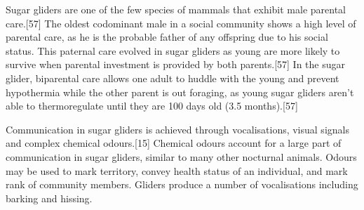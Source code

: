 \documentclass[twoside, 12pt, letterpaper]{report}\usepackage[]{graphicx}\usepackage[]{color}
\begin{document}
\begin{multicols*}{2}
Sugar gliders are one of the few species of mammals that exhibit male parental care.[57] The oldest codominant male in a social community shows a high level of parental care, as he is the probable father of any offspring due to his social status. This paternal care evolved in sugar gliders as young are more likely to survive when parental investment is provided by both parents.[57] In the sugar glider, biparental care allows one adult to huddle with the young and prevent hypothermia while the other parent is out foraging, as young sugar gliders aren't able to thermoregulate until they are 100 days old (3.5 months).[57]

Communication in sugar gliders is achieved through vocalisations, visual signals and complex chemical odours.[15] Chemical odours account for a large part of communication in sugar gliders, similar to many other nocturnal animals. Odours may be used to mark territory, convey health status of an individual, and mark rank of community members. Gliders produce a number of vocalisations including barking and hissing.








\end{multicols*}



\begin{multicols*}{2}















\end{multicols*}



\begin{multicols*}{2}













\end{multicols*}
\end{document}
